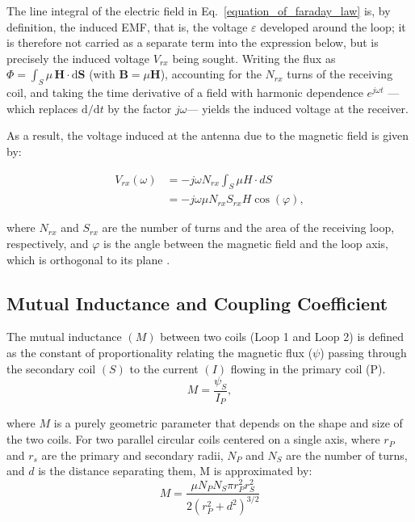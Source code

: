 The line integral of the electric field in
Eq.~\eqref{equation_of_faraday_law} is, by definition, the induced EMF, that is,
the voltage $\varepsilon$ developed around the loop; it is therefore not carried as a
separate term into the expression below, but is precisely the induced voltage
$V_{rx}$ being sought. Writing the flux as
$\Phi = \int_{S}\mu\,\mathbf{H}\cdot \mathrm{d}\mathbf{S}$ (with $\mathbf{B}=\mu\mathbf{H}$),
accounting for the $N_{rx}$ turns of the receiving coil, and taking the time
derivative of a field with harmonic dependence $e^{j\omega t}$ —which replaces
$\mathrm{d}/\mathrm{d}t$ by the factor $j\omega$— yields the induced voltage at the
receiver.


As a result, the voltage induced at the antenna due to the magnetic field is given by:

\begin{equation}
    \label{equation_of_magnetic_induction}
    \begin{split}
        V_{rx}(\omega) &= -j\omega N_{rx}\int_{S}\mu H\cdot dS \\
                       &= -j\omega\mu N_{rx}S_{rx}H \cos(\varphi) ,
    \end{split} 
\end{equation}

\noindent where $N_{rx}$ and $S_{rx}$ are the number of turns and the area of the receiving loop, respectively, and $\varphi$ is the angle between the magnetic field and the loop axis, which is orthogonal to its plane 
\cite{carreno2016through}.

\subsection{ Mutual Inductance and Coupling Coefficient}\label{subsec:mutual-inductance}



The mutual inductance $(M)$ between two coils (Loop 1 and Loop 2) is defined as the constant of proportionality relating the magnetic flux ($\psi$) passing through the secondary coil $(S)$ to the current $(I)$ flowing in the primary coil (P).
\begin{equation}
    \label{equation_of_mutual_inductance}
    M = \frac{\psi_{S}}{I_{P}} ,
\end{equation}

\noindent where $M$ is a purely geometric parameter that depends on the shape and size of the two coils. For two parallel circular coils centered on a single axis, where $r_P$ and $r_s$ are the primary and secondary radii, $N_P$ and $N_S$ are the number of turns, and $d$ is the distance separating them, M is approximated by:
\begin{equation}
    M = \frac{\mu N_{P} N_{S} \pi r_{P}^{2} r_{S}^{2}}{2 (r_{P}^{2} + d^{2})^{3/2}}
\end{equation}

